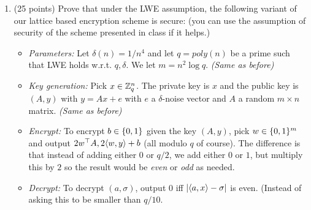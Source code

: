 \documentclass{article}
\begin{document}
\begin{enumerate}[,start=5]%

\item{}
(25 points) Prove that under the LWE assumption, the following variant of our lattice based encryption scheme is secure: (you can use the assumption of security of the scheme presented in class if it helps.)%

\begin{itemize}%

\item{}
\emph{Parameters:} Let $\delta(n)=1/n^4$ and let $q=poly(n)$ be a prime such that LWE holds w.r.t. $q,\delta$. We let $m = n^2\log q$. \emph{(Same as before)}%

\item{}
\emph{Key generation:} Pick $x\in\mathbb{Z}_q^n$. The private key is $x$ and the public key is $(A,y)$ with $y=Ax+e$ with $e$ a $\delta$-noise vector and $A$ a random $m\times n$ matrix. \emph{(Same as before)}%

\item{}
\emph{Encrypt:} To encrypt $b\in\{0,1\}$ given the key $(A,y)$, pick $w\in\{0,1\}^m$ and output $2w^\top A, 2\langle w,y \rangle+b$ (all modulo $q$ of course). The difference is that instead of adding either $0$ or $q/2$, we add either $0$ or $1$, but multiply this by $2$ so the result would be \emph{even} or \emph{odd} as needed.%

\item{}
\emph{Decrypt:} To decrypt $(a,\sigma)$, output $0$ iff $|\langle a,x \rangle-\sigma|$ is even. (Instead of asking this to be smaller than $q/10$.%


\end{itemize}
\end{enumerate}
\end{document}
